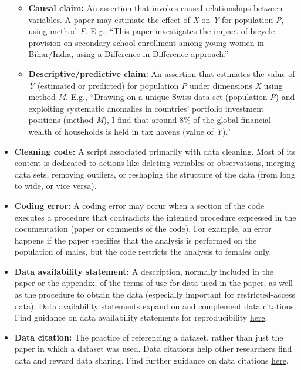 \documentclass[
]{book}
\providecommand{\tightlist}{%
  \setlength{\itemsep}{0pt}\setlength{\parskip}{0pt}}
\begin{document}
\begin{itemize}
  \begin{itemize}
  \tightlist
  \item
    \textbf{Causal claim:} An assertion that invokes causal relationships between variables. A paper may estimate the effect of \emph{X} on \emph{Y} for population \emph{P}, using method \emph{F}. E.g., ``This paper investigates the impact of bicycle provision on secondary school enrollment among young women in Bihar/India, using a Difference in Difference approach.''\\
  \item
    \textbf{Descriptive/predictive claim:} An assertion that estimates the value of \emph{Y} (estimated or predicted) for population \emph{P} under dimensions \emph{X} using method \emph{M}. E.g., ``Drawing on a unique Swiss data set (population \emph{P}) and exploiting systematic anomalies in countries' portfolio investment positions (method \emph{M}), I find that around 8\% of the global financial wealth of households is held in tax havens (value of \emph{Y}).''
  \end{itemize}
\item
  \textbf{Cleaning code:} A script associated primarily with data cleaning. Most of its content is dedicated to actions like deleting variables or observations, merging data sets, removing outliers, or reshaping the structure of the data (from long to wide, or vice versa).
\item
  \textbf{Coding error:} A coding error may occur when a section of the code executes a procedure that contradicts the intended procedure expressed in the documentation (paper or comments of the code). For example, an error happens if the paper specifies that the analysis is performed on the population of males, but the code restricts the analysis to females only.
\item
  \textbf{Data availability statement:} A description, normally included in the paper or the appendix, of the terms of use for data used in the paper, as well as the procedure to obtain the data (especially important for restricted-access data). Data availability statements expand on and complement data citations. Find guidance on data availability statements for reproducibility \href{https://social-science-data-editors.github.io/guidance/Requested_information_dcas.html\#what-are-data-and-code-availability-statements-dcas}{here}.
\item
  \textbf{Data citation:} The practice of referencing a dataset, rather than just the paper in which a dataset was used. Data citations help other researchers find data and reward data sharing. Find further guidance on data citations \href{https://social-science-data-editors.github.io/guidance/Data_citation_guidance.html}{here}.

\end{itemize}
\end{document}

